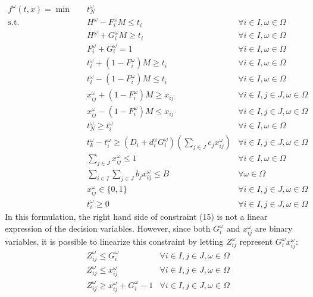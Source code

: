 \documentclass[11pt]{article}
\begin{document}
		\begin{align}
			f^\omega(t,x) = \min \quad & t_N^\omega &\\
			\text{s.t.} \quad & H^\omega - F_i^\omega M \leq t_i & \forall i \in I, \omega \in \Omega\\
			& H^\omega + G_i^\omega M \geq t_i & \forall i \in I, \omega \in \Omega\\
			& F_i^\omega + G_i^\omega = 1 & \forall i \in I, \omega \in \Omega \\
			& t_i^\omega + (1 - F_i^\omega)M \geq t_i & \forall i \in I, \omega \in \Omega\\
			& t_i^\omega - (1 - F_i^\omega)M \leq t_i & \forall i \in I, \omega \in \Omega\\
			& x_{ij}^\omega + (1 - F_i^\omega)M \geq x_{ij} & \forall i \in I, j \in J, \omega \in \Omega \\
			& x_{ij}^\omega - (1 - F_i^\omega)M \leq x_{ij} & \forall i \in I, j \in J, \omega \in \Omega \\
			& t_N^\omega \geq t_i^\omega & \forall i \in I, \omega \in \Omega\\
			& t_k^\omega - t_i^\omega \geq (D_i + d_i^\omega G_i^\omega)(\sum_{j \in J} e_jx_{ij}^\omega) & \forall i \in I, j \in J, \omega \in \Omega\\
			& \sum_{j \in J} x_{ij}^\omega \leq 1 & \forall i \in I, \omega \in \Omega\\
			& \sum_{i \in I}\sum_{j \in J} b_jx_{ij}^\omega \leq B & \forall \omega \in \Omega\\
			& x_{ij}^\omega \in \{0,1\} & \forall i \in I, j \in J, \omega \in \Omega\\
			& t_{i}^\omega \geq 0 & \forall i \in I, j \in J, \omega \in \Omega
		\end{align}
		In this formulation, the right hand side of constraint (15) is not a linear expression of the decision variables. However, since both \(G_i^\omega\) and \(x_{ij}^\omega\) are binary variables, it is possible to linearize this constraint by letting \(Z_{ij}^\omega\) represent \(G_i^\omega x_{ij}^\omega\):
		\begin{align*}
			& Z_{ij}^\omega \leq G_i^\omega & \forall i \in I, j \in J, \omega \in \Omega\\
			& Z_{ij}^\omega \leq x_{ij}^\omega & \forall i \in I, j \in J, \omega \in \Omega\\
			& Z_{ij}^\omega \geq x_{ij}^\omega + G_i^\omega - 1 & \forall i \in I, j \in J, \omega \in \Omega
		\end{align*}
\end{document}
